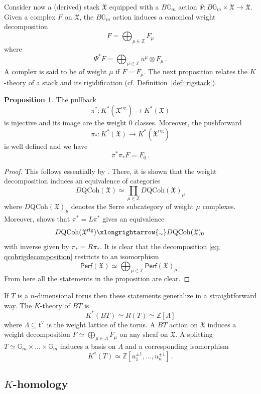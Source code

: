 \documentclass[12pt]{amsart}
\theoremstyle{definition}
\newtheorem{proposition}[definition]{Proposition}
\newcommand{\BG}{{\mathbb{G}}}
\newcommand{\BZ}{{\mathbb{Z}}}
\newcommand{\1}{\mathbf 1}
\newcommand{\FX}{{\mathfrak{X}}}
\newcommand{\QCoh}{\mathrm{QCoh}}
\newcommand{\Perf}{\mathsf{Perf}}
\newcommand{\rig}{\mathrm{rig}}
\newcommand{\isoto}{\xlongrightarrow{\raisebox{-0.3ex}[0pt][0pt]{\(\scriptstyle\sim\)}}}
\begin{document}
Consider now a (derived) stack  $\FX$ equipped with a $B\BG_m$ action $\Psi\colon B\BG_m\times \FX\to \FX$. Given a complex $F$ on $\FX$, the $B\BG_m$ action induces a canonical weight decomposition
\[F=\bigoplus_{\mu\in \BZ} F_\mu\]
where
\[\Psi^\ast F=\bigoplus_{\mu\in \BZ} u^\mu\otimes F_\mu\,.\]
A complex is said to be of weight $\mu$ if $F=F_\mu$. The next proposition relates the $K$-theory of a stack and its rigidification (cf. Definition~\ref{def: rigstack}). 

\begin{proposition}\label{prop: Ktheoryrig}
The pullback
\[\pi^\ast \colon K^\ast(\FX^\rig)\to K^\ast(\FX)\]
is injective and its image are the weight 0 classes. Moreover, the pushforward
\[\pi_\ast \colon K^\ast(\FX)\to K^\ast(\FX^\rig)\]
is well defined and we have
\[\pi^\ast \pi_\ast F=F_0\,.\]
\end{proposition}
\begin{proof}
This follows essentially by \cite{BSgerbs}. There, it is shown that the weight decomposition induces an equivalence of categories
\begin{equation}\label{eq: qcohrigdecomposition}
D\QCoh(\FX)\simeq \prod_{\mu\in \BZ}D\QCoh(\FX)_\mu\end{equation}
where $D\QCoh(\FX)_\mu$ denotes the Serre subcategory of weight $\mu$ complexes. Moreover, \cite[Proposition 5.7]{BSgerbs} shows that $\pi^\ast=L\pi^\ast$ gives an equivalence 
\[D\QCoh(\FX^\rig)\isoto D\QCoh(\FX)_0\,\]
with inverse given by $\pi_\ast=R\pi_\ast$. It is clear that the decomposition \eqref{eq: qcohrigdecomposition} restricts to an isomorphism
\begin{equation*}
\Perf(\FX)\simeq \bigoplus_{\mu\in \BZ}\Perf(\FX)_\mu\,.\end{equation*}
From here all the statements in the proposition are clear.
\end{proof}


If $T$ is a $n$-dimensional torus then these statements generalize in a straightforward way. The $K$-theory of $BT$ is
\[K^\ast(BT)\simeq R(T)\simeq \BZ[\Lambda]\]
where $\Lambda\subseteq \mathfrak t^\vee$ is the weight lattice of the torus. A $BT$ action on $\FX$ induces a weight decomposition $F\simeq \bigoplus_{\mu\in \Lambda} F_\mu$ on any sheaf on $\FX$. A splitting $T\simeq \BG_m\times \ldots\times \BG_m$ induces a basis on $\Lambda$ and a corresponding isomorphism
\[K^\ast(T)\simeq \BZ[u_1^{\pm 1}, \ldots, u_n^{\pm 1}]\,.\]


\subsection{$K$-homology}\label{subsec: K-hom}
\end{document}
